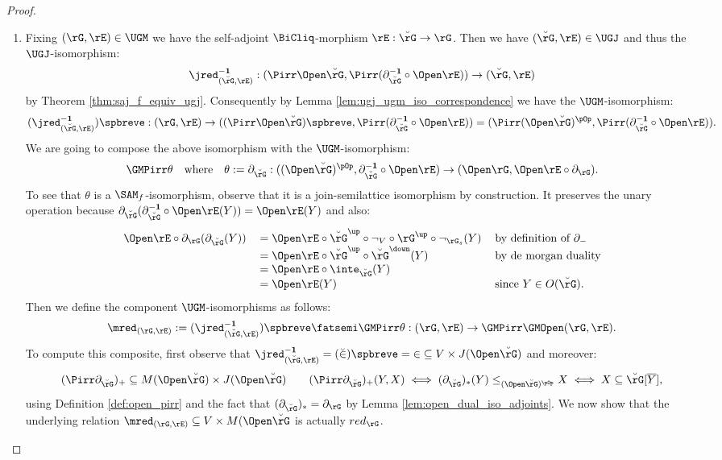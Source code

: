 \documentclass{article}
\begin{document}
\begin{proof}
\begin{enumerate}
\item
Fixing $(\rG,\rE) \in \UGM$ we have the self-adjoint $\BiCliq$-morphism $\rE : \breve{\rG} \to \rG$. Then we have $(\breve{\rG},\rE) \in \UGJ$ and thus the $\UGJ$-isomorphism:
\[
\jred_{(\breve{\rG},\rE)}^{\bf-1} : (\Pirr\Open\breve{\rG},\Pirr(\partial_{\breve{\rG}}^{\bf-1} \circ \Open\rE )) \to (\breve{\rG},\rE)
\]
by Theorem \ref{thm:saj_f_equiv_ugj}. Consequently by Lemma \ref{lem:ugj_ugm_iso_correspondence} we have the $\UGM$-isomorphism:
\[
(\jred_{(\breve{\rG},\rE)}^{\bf-1})\spbreve : (\rG,\rE) \to ((\Pirr\Open\breve{\rG})\spbreve,\Pirr(\partial_{\breve{\rG}}^{\bf-1} \circ \Open\rE ))
= (\Pirr(\Open\breve{\rG})^\pOp,\Pirr(\partial_{\breve{\rG}}^{\bf-1} \circ \Open\rE )).
\]
We are going to compose the above isomorphism with the $\UGM$-isomorphism:
\[
\GMPirr \theta
\quad\text{where}\quad
\theta := \partial_{\breve{\rG}}
: ((\Open\breve{\rG})^\pOp,\partial_{\breve{\rG}}^{\bf-1} \circ \Open\rE ) \to (\Open\rG,\Open\rE \circ \partial_\rG).
\]
To see that $\theta$ is a $\SAM_f$-isomorphism, observe that it is a join-semilattice isomorphism by construction. It preserves the unary operation because $\partial_{\breve{\rG}}(\partial_{\breve{\rG}}^{\bf-1} \circ \Open\rE(Y)) = \Open\rE(Y)$ and also:
\[
\begin{tabular}{lll}
$\Open\rE \circ \partial_\rG(\partial_{\breve{\rG}}(Y))$
&
$= \Open\rE \circ \breve{\rG}^\up \circ \neg_V \circ \rG^\up \circ \neg_{\rG_s}(Y)$
& by definition of $\partial_-$
\\&
$= \Open\rE \circ \breve{\rG}^\up \circ \breve{\rG}^\down (Y)$
& by de morgan duality
\\&
$= \Open\rE \circ \inte_{\breve{\rG}} (Y)$
\\&
$= \Open\rE(Y)$
& since $Y \in O(\breve{\rG})$.
\end{tabular}
\]
Then we define the component $\UGM$-isomorphisms as follows:
\[
\mred_{(\rG,\rE)} := (\jred_{(\breve{\rG},\rE)}^{\bf-1})\spbreve \fatsemi \GMPirr \theta : (\rG,\rE) \to \GMPirr\GMOpen(\rG,\rE).
\]
To compute this composite, first observe that $\jred_{(\breve{\rG},\rE)}^{\bf-1} = (\breve{\in})\spbreve = \; \in \; \subseteq V \times J(\Open\breve{\rG})$ and moreover:
\[
(\Pirr\partial_{\breve{\rG}})_+ \subseteq M(\Open\breve{\rG}) \times J(\Open\breve{\rG})
\qquad
(\Pirr\partial_{\breve{\rG}})_+(Y,X) \iff (\partial_{\breve{\rG}})_*(Y) \leq_{(\Open\breve{\rG})^{\pOp}} X \iff X \subseteq \breve{\rG}[\overline{Y}],
\]
using Definition \ref{def:open_pirr} and the fact that $(\partial_{\breve{\rG}})_* = \partial_\rG$ by Lemma \ref{lem:open_dual_iso_adjoints}. We now show that the underlying relation $\mred_{(\rG,\rE)} \subseteq V \times M(\Open\breve{\rG}$ is actually $red_\rG$.

\end{enumerate}
\end{proof}
\end{document}
